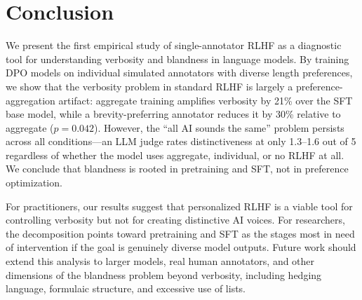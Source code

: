 \section{Conclusion}
\label{sec:conclusion}

We present the first empirical study of single-annotator RLHF as a diagnostic tool for understanding verbosity and blandness in language models. By training DPO models on individual simulated annotators with diverse length preferences, we show that the verbosity problem in standard RLHF is largely a preference-aggregation artifact: aggregate training amplifies verbosity by 21\% over the SFT base model, while a brevity-preferring annotator reduces it by 30\% relative to aggregate ($p{=}0.042$). However, the ``all AI sounds the same'' problem persists across all conditions---an LLM judge rates distinctiveness at only 1.3--1.6 out of 5 regardless of whether the model uses aggregate, individual, or no RLHF at all. We conclude that blandness is rooted in pretraining and SFT, not in preference optimization.

For practitioners, our results suggest that personalized RLHF is a viable tool for controlling verbosity but not for creating distinctive AI voices. For researchers, the decomposition points toward pretraining and SFT as the stages most in need of intervention if the goal is genuinely diverse model outputs. Future work should extend this analysis to larger models, real human annotators, and other dimensions of the blandness problem beyond verbosity, including hedging language, formulaic structure, and excessive use of lists.
